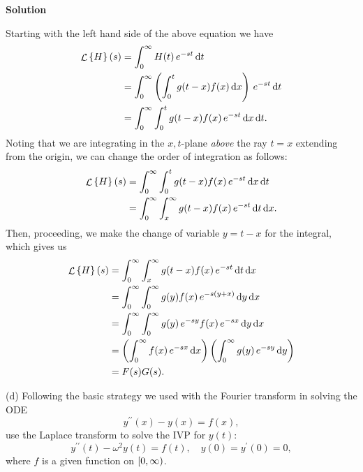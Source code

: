 \documentclass{article}
\DeclareMathOperator{\Lagr}{\mathcal{L}}
\begin{document}
\textbf{Solution}

Starting with the left hand side of the above equation we have
%
\begin{align*}
    \Lagr \cbr{H}(s)
        &= \int_0^\infty H(t) \, e^{-s t} \dif t \\
        &= \int_0^\infty
            \del{\int_0^t g(t - x) f(x) \dif x}
            \, e^{-s t} \dif t
            \\
        &= \int_0^\infty \int_0^t
            g(t - x) f(x) \, e^{-s t}
            \dif x \dif t
            .
\end{align*}
%
Noting that we are integrating in the $x, t$-plane \textit{above} the
ray $t = x$ extending from the origin, we can change the order of
integration as follows:
%
\begin{align*}
    \Lagr \cbr{H}(s)
        &= \int_0^\infty \int_0^t
            g(t - x) f(x) \, e^{-s t}
            \dif x \dif t
            \\
        &= \int_0^\infty \int_x^\infty
            g(t - x) f(x) \, e^{-s t}
            \dif t \dif x
            .
\end{align*}
%
Then, proceeding, we make the change of variable $y = t - x$ for the
integral, which gives us
%
\begin{align*}
    \Lagr \cbr{H}(s)
        &= \int_0^\infty \int_x^\infty
            g(t - x) f(x) \, e^{-s t}
            \dif t \dif x
            \\
        &= \int_0^\infty \int_0^\infty
            g(y) f(x) \, e^{-s (y + x)}
            \dif y \dif x
            \\
        &= \int_0^\infty \int_0^\infty
            g(y) \, e^{-s y} f(x) \, e^{-s x}
            \dif y \dif x
            \\
        &= \del{
            \int_0^\infty
            f(x) \, e^{-s x}
            \dif x
           }
           \del{
            \int_0^\infty
            g(y) \, e^{-s y}
            \dif y
           }
            \\
        &= F(s) G(s)
            .
\end{align*}

\vspace{5mm}

(d) Following the basic strategy we used with the Fourier transform in
solving the ODE
%
\begin{equation*}
    y^{\prime \prime}(x) - y(x) = f(x)
    ,
\end{equation*}
%
use the Laplace transform to solve the IVP for $y(t)$:
%
\begin{equation*}
    y^{\prime \prime}(t) - \omega^2 y(t) = f(t)
    ,\quad
    y(0) = y^\prime(0) = 0
    ,
\end{equation*}
%
where $f$ is a given function on $\intco{0, \infty}$.
\end{document}
